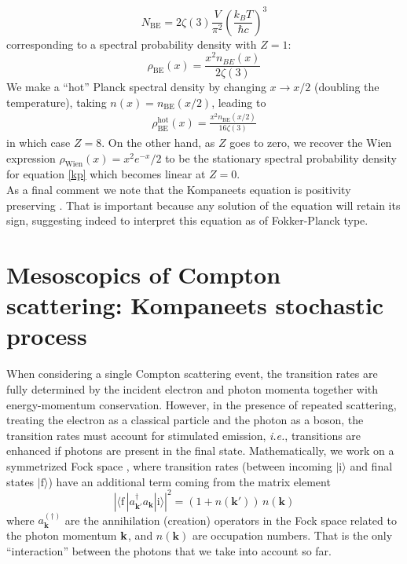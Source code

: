 \documentclass[a4paper,12pt,reqno,superscriptaddress,nofootinbib]{revtex4}
\newcommand{\0}{^{(0)}}
\newcommand{\1}{^{(1)}}
\newcommand{\2}{^{(2)}}
\begin{document}
\[
N_\text{BE} = 2 \zeta(3) \frac{V}{\pi^2} \left( \frac{k_B T}{\hbar c} \right)^3
\]
corresponding to a spectral probability density with $Z = 1$:
\begin{equation}\label{eq:bespd}
\rho_\text{BE}(x) = \frac{x^2 n_{BE}(x)}{2\zeta(3)}
\end{equation}
We make a ``hot'' Planck spectral density by changing $x\rightarrow x/2$ (doubling the temperature), taking $n(x) = n_\text{BE}(x/2)$, leading to
\begin{eqnarray}\label{hott}
\rho_\text{BE}^\text{hot}(x) = \frac{x^2 n_\text{BE}(x/2)}{16\zeta(3)}
\end{eqnarray}
in which case $Z=8$.  On the other hand, as $Z$ goes to zero, we recover the Wien expression $\rho_\text{Wien}(x) = x^2 e^{-x}/2$ to be the stationary spectral probability density for equation \eqref{kp} which becomes linear at $Z=0$.\\


As a final comment we note that the Kompaneets equation is positivity preserving \cite{positivity}. That is important because any solution of the equation will retain its sign, suggesting indeed to interpret this equation as of Fokker-Planck type. 

\section{Mesoscopics of Compton scattering:   Kompaneets stochastic process}\label{ksp}	

When considering a single Compton scattering event, the transition rates are fully determined by the incident electron and photon momenta together with energy-momentum conservation. However, in the presence of repeated scattering, treating the electron as a classical particle and the photon as a boson, the transition rates must account for stimulated emission, \textit{i.e.}, transitions are enhanced if photons are present in the final state. Mathematically, we work on a symmetrized Fock space  \cite{kadanoff}, where transition rates (between incoming  $|\text{i}\rangle$ and final states $|\text{f}\rangle$) have an additional term coming from the matrix element
\begin{equation}
\left|\langle \text{f}\,| a^\dagger_{{\mathbf k'}}a_{\mathbf k}|\text{i}\rangle\right|^2 = (1+n({\mathbf k'}))\,n({\mathbf k})
\end{equation}
where $a^{(\dagger)}_{\mathbf k}$ are the annihilation (creation) operators in the Fock space  related to the photon momentum $\vb{k}$, and $n({\mathbf k})$ are occupation numbers.  That is the only ``interaction'' between the photons that we take into account so far.
\end{document}
